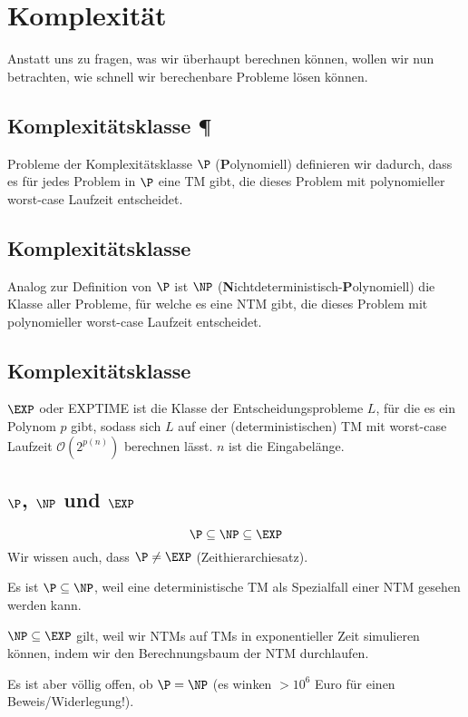 \documentclass[a4paper,parskip=half*,DIV=7,fontsize=11pt]{scrartcl}
\begin{document}
\section{Komplexität}
Anstatt uns zu fragen, was wir überhaupt berechnen können, wollen wir nun betrachten, wie schnell wir berechenbare Probleme lösen können.

\subsection[Komplexitätsklasse P]{Komplexitätsklasse \P}
Probleme der Komplexitätsklasse $\P$ (\textbf Polynomiell) definieren wir dadurch, dass es für jedes Problem in $\P$ eine TM gibt, die dieses Problem mit polynomieller worst-case Laufzeit entscheidet.

\subsection[Komplexitätsklasse NP]{Komplexitätsklasse \NP}
Analog zur Definition von $\P$  ist $\NP$  (\textbf Nichtdeterministisch-\textbf Polynomiell) die Klasse aller Probleme, für welche es eine NTM gibt, die dieses Problem mit polynomieller worst-case Laufzeit entscheidet.

\subsection[Komplexitätsklasse EXP]{Komplexitätsklasse \EXP}
$\EXP$ oder EXPTIME ist die Klasse der Entscheidungsprobleme $L$, für die es ein Polynom $p$ gibt, sodass sich $L$ auf einer (deterministischen) TM mit worst-case Laufzeit $\mathcal{O}(2^{p(n)})$ berechnen lässt. $n$ ist die Eingabelänge.

\subsection[P, NP und EXP]{$\P$, $\NP$ und $\EXP$}
\[ \P \subseteq \NP \subseteq \EXP \]
Wir wissen auch, dass $\P \neq \EXP$ (Zeithierarchiesatz).

Es ist $\P \subseteq \NP$, weil eine deterministische TM als Spezialfall einer NTM gesehen werden kann.

$\NP \subseteq \EXP$ gilt, weil wir NTMs auf TMs in exponentieller Zeit simulieren können, indem wir den Berechnungsbaum der NTM durchlaufen.

Es ist aber völlig offen, ob $\P = \NP$ (es winken $> 10^6$ Euro für einen Beweis/Widerlegung!).
\end{document}
